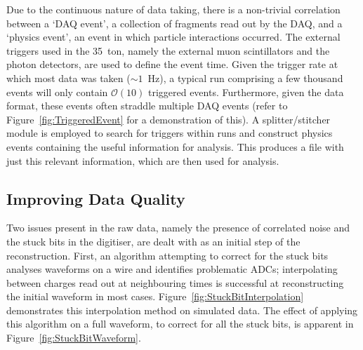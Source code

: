 Due to the continuous nature of data taking, there is a non-trivial correlation between a `DAQ event', a collection of fragments read out by the DAQ, and a `physics event', an event in which particle interactions occurred.  The external triggers used in the 35~ton, namely the external muon scintillators and the photon detectors, are used to define the event time.  Given the trigger rate at which most data was taken ($\sim1$~Hz), a typical run comprising a few thousand events will only contain $\mathcal{O}(10)$ triggered events.  Furthermore, given the data format, these events often straddle multiple DAQ events (refer to Figure~\ref{fig:TriggeredEvent} for a demonstration of this).  A splitter/stitcher module is employed to search for triggers within runs and construct physics events containing the useful information for analysis.  This produces a file with just this relevant information, which are then used for analysis.

\subsection{Improving Data Quality}\label{sec:ImprovingDataQuality}

Two issues present in the raw data, namely the presence of correlated noise and the stuck bits in the digitiser, are dealt with as an initial step of the reconstruction.  First, an algorithm attempting to correct for the stuck bits analyses waveforms on a wire and identifies problematic ADCs; interpolating between charges read out at neighbouring times is successful at reconstructing the initial waveform in most cases.  Figure~\ref{fig:StuckBitInterpolation} demonstrates this interpolation method on simulated data.  The effect of applying this algorithm on a full waveform, to correct for all the stuck bits, is apparent in Figure~\ref{fig:StuckBitWaveform}.

